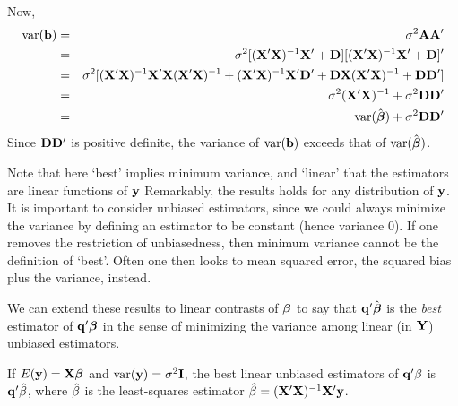 Now,
\begin{eqnarray*}
\mathrm{var}(\mathbf{b}) &=& \sigma^2 \mathbf{A} \mathbf{A}' \\
&=& \sigma^2 [(\mathbf{X}' \mathbf{X})^{-1}\mathbf{X}'  + \mathbf{D}][(\mathbf{X}' \mathbf{X})^{-1}\mathbf{X}' + \mathbf{D}]'\\
&=& \sigma^2  [(\mathbf{X}' \mathbf{X})^{-1}\mathbf{X}' \mathbf{X} (\mathbf{X}' \mathbf{X})^{-1} + (\mathbf{X}' \mathbf{X})^{-1}\mathbf{X}'\mathbf{D}' + \mathbf{D}\mathbf{X}(\mathbf{X}' \mathbf{X})^{-1} + \mathbf{D} \mathbf{D}']\\
&=&\sigma^2 (\mathbf{X}' \mathbf{X})^{-1} + \sigma^2 \mathbf{D} \mathbf{D}'\\
&=&\mathrm{var}({\hat {\mbox{\boldmath $\beta$}}})+ \sigma^2 \mathbf{D} \mathbf{D}'\\
\end{eqnarray*}
Since $ \mathbf{D} \mathbf{D}'$ is positive definite, the variance of $\mathrm{var}(\mathbf{b})$ exceeds that of $\mathrm{var}({\hat {\mbox{\boldmath $\beta$}}})$.

\bigskip

Note that here `best' implies minimum variance, and `linear' that the estimators are linear functions of $\mathbf{y}$ Remarkably, the results holds for any distribution of $\mathbf{y}$.
It is important to consider unbiased estimators, since we could always minimize the variance
by defining an estimator to be constant (hence variance $0$). If one
removes the restriction of unbiasedness, then minimum variance cannot
be the definition of `best'. Often one then looks to mean squared
error, the squared bias plus the variance, instead. 

\vb
We can extend these results to linear contrasts of $\boldsymbol{\beta}$ 
to say that $\mathbf{q}' \hat {\boldsymbol{\beta}}$ is the {\it best}
estimator of $\mathbf{q}' \boldsymbol{\beta}$ in the sense of minimizing the variance among
linear (in $\mathbf{Y}$) unbiased estimators.

\btheo
If $E(\mathbf{y}) = \mathbf{X} \mbox{\boldmath $\beta$}$ and $\mathrm{var}(\mathbf{y}) = \sigma^2 {\bf I}$, the best linear unbiased estimators of $\mathbf{q}'{\bf \beta}$ is $\mathbf{q}'{\hat {\bf \beta}}$, where ${\hat {\bf \beta}}$ is the least-squares estimator ${\hat {\bf \beta}} = (\mathbf{X}'\mathbf{X})^{-1} \mathbf{X}' \mathbf{y}$.
\estheo






